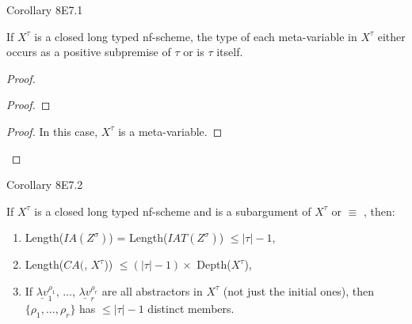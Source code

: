 \begin{frame}{Corollary 8E7.1}
\begin{corollary}[8E7.1 in Hindley's]
    If $X^\tau$ is a closed long typed nf-scheme, the type of each meta-variable in $X^\tau$ either occurs as a positive subpremise of $\tau$ or is $\tau$ itself. 
\end{corollary}

\begin{proof}
\begin{proof}
\end{proof}

\medskip 

\begin{proof}
In this case, $X^\tau$ is a meta-variable. 
\end{proof} 
\end{proof}

\end{frame}

\begin{frame}[allowframebreaks]{Corollary 8E7.2}
\begin{corollary}[8E7.2 in Hindley's]
If $X^\tau$ is a closed long typed nf-scheme and  is a subargument of $X^\tau$ or  $\equiv$ , then: 
\begin{enumerate}
    \item Length($IA(Z^\sigma)$) = Length($IAT(Z^\sigma)$) $\leq |\tau| - 1$, 
    \item Length($CA($, $X^\tau$)) $\le (|\tau|-1) \times$ Depth($X^\tau$), 
    \item If $\underline{\lambda v}_{1}^{\rho_1}$, $\ldots$, $\underline{\lambda v}_{r}^{\rho_r}$ are all abstractors in $X^\tau$ (not just the initial ones), then $\{\rho_1, \ldots, \rho_r \}$ has $\le |\tau|-1$ distinct members.  
\end{enumerate}
\end{corollary}
\end{frame}

